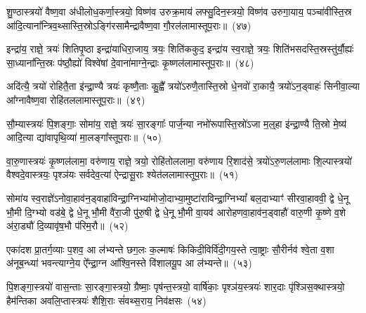 शु॒ण्ठास्त्रयो॑ वैष्ण॒वा अ॑धीलोध॒कर्णा॒स्त्रयो॒ विष्ण॑व उरुक्र॒माय॑ लफ्सु॒दिन॒स्त्रयो॒ विष्ण॑व उरुगा॒याय॒ पञ्चा॑वीस्ति॒स्र आ॑दि॒त्याना᳚न्त्रिव॒थ्सास्ति॒स्रो\-ऽङ्गि॑रसामैन्द्रावैष्ण॒वा गौ॒रल॑लामास्तूप॒राः॥~(४७)

{\anuvakamend[{शु॒ण्ठा विꣳ॑श॒तिः}]}%

इन्द्रा॑य॒ राज्ञे॒ त्रयः॑ शितिपृ॒ष्ठा इन्द्रा॑याधिरा॒जाय॒ त्रयः॒ शिति॑ककुद॒ इन्द्रा॑य स्व॒राज्ञे॒ त्रयः॒ शिति॑भसदस्ति॒स्रस्तु॑र्यौ॒ह्यः॑ सा॒ध्याना᳚न्ति॒स्रः प॑ष्ठौ॒ह्यो॑ विश्वे॑षां दे॒वाना॑माग्ने॒न्द्राः कृ॒ष्णल॑लामास्तूप॒राः॥~(४८)

{\anuvakamend[{इन्द्रा॑य॒ राज्ञे॒ द्वाविꣳ॑शतिः}]}%

अदि॑त्यै॒ त्रयो॑ रोहितै॒ता इ॑न्द्रा॒ण्यै त्रयः॑ कृष्णै॒ताः कु॒ह्वै᳚ त्रयो॑\-ऽरुणै॒तास्ति॒स्रो धे॒नवो॑ रा॒कायै॒ त्रयो॑\-ऽन॒ड्वाहः॑ सिनीवा॒ल्या आ᳚ग्नावैष्ण॒वा रोहि॑तललामास्तूप॒राः॥~(४९)

{\anuvakamend[{अदि॑त्या अ॒ष्टाद॑श}]}%

सौ॒म्यास्त्रयः॑ पि॒शङ्गाः॒ सोमा॑य॒ राज्ञे॒ त्रयः॑ सा॒रङ्गाः᳚ पार्ज॒न्या नभो॑रूपास्ति॒स्रो॑\-ऽजा म॒ल्॒\mbox{}हा इ॑न्द्रा॒ण्यै ति॒स्रो मे॒ष्य॑ आदि॒त्या द्या॑वापृथि॒व्या॑ मा॒लङ्गा᳚स्तूप॒राः॥~(५०)

{\anuvakamend[{सौ॒म्या एका॒न्नविꣳ॑शतिः}]}%

वा॒रु॒णास्त्रयः॑ कृ॒ष्णल॑लामा॒ वरु॑णाय॒ राज्ञे॒ त्रयो॒ रोहि॑तोललामा॒ वरु॑णाय रि॒शाद॑से॒ त्रयो॑\-ऽरु॒णल॑लामाः शि॒ल्पास्त्रयो॑ वैश्वदे॒वास्त्रयः॒ पृश्ञ॑यः सर्वदेव॒त्या॑ ऐन्द्रासू॒राः श्येत॑ललामास्तूप॒राः॥~(५१)

{\anuvakamend[{वा॒रु॒णा विꣳ॑श॒तिः}]}%

सोमा॑य स्व॒राज्ञे॑\-ऽनोवा॒हाव॑न॒ड्वाहा॑विन्द्रा॒ग्निभ्या॑मोजो॒दाभ्या॒मुष्टा॑राविन्द्रा॒ग्नि\-भ्यां᳚ बल॒दाभ्याꣳ॑ सीरवा॒हाववी॒ द्वे धे॒नू भौ॒मी दि॒ग्भ्यो वड॑बे॒ द्वे धे॒नू भौ॒मी वै॑रा॒जी पु॑रु॒षी द्वे धे॒नू भौ॒मी वा॒यव॑ आरोहणवा॒हाव॑न॒ड्वाहौ॑ वारु॒णी कृ॒ष्णे व॒शे अ॑रा॒ड्यौ॑ दि॒व्यावृ॑ष॒भौ प॑रिम॒रौ॥~(५२)

{\anuvakamend[{सोमा॑य स्व॒राज्ञे॒ चतु॑स्त्रिꣳशत्}]}%

एका॑\-दश प्रा॒तर्ग॒व्याः प॒शव॒ आ ल॑भ्यन्ते छग॒लः क॒ल्माषः॑ किकिदी॒विर्वि॑दी॒गय॒स्ते त्वा॒ष्ट्राः सौ॒रीर्नव॑ श्वे॒ता व॒शा अ॑नूब॒न्ध्या॑ भवन्त्याग्ने॒य ऐ᳚न्द्रा॒ग्न आ᳚श्वि॒नस्ते वि॑शालयू॒प आ ल॑भ्यन्ते॥~(५३)

{\anuvakamend[{एका॑\-दश॒ पञ्च॑विꣳशतिः}]}%

पि॒शङ्गा॒स्त्रयो॑ वास॒न्ताः सा॒रङ्गा॒स्त्रयो॒ ग्रैष्माः॒ पृष॑न्त॒स्त्रयो॒ वार्\mbox{}षि॑काः॒ पृश्ञ॑य॒स्त्रयः॑ शार॒दाः पृ॑श्ञिस॒क्थास्त्रयो॒ हैम॑न्तिका अवलि॒प्तास्त्रयः॑ शैशि॒राः सं॑वथ्स॒राय॒ निव॑क्षसः~(५४)

